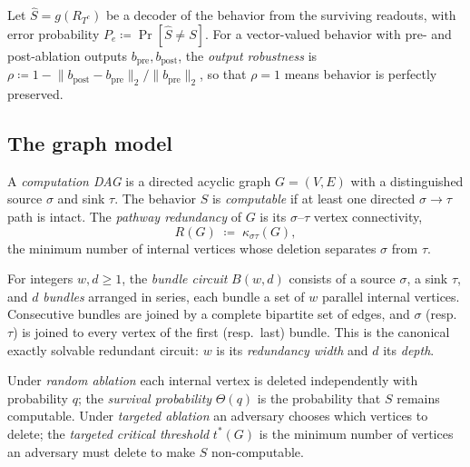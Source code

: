 \begin{definition}
\label{def:fidelity}
Let $\widehat{S}=g(R_{T^c})$ be a decoder of the behavior from the surviving
readouts, with error probability $P_e\coloneqq\Pr[\widehat{S}\neq S]$. For a
vector-valued behavior with pre- and post-ablation outputs $b_{\mathrm{pre}},
b_{\mathrm{post}}$, the \emph{output robustness} is
$\rho\coloneqq 1-\lVert b_{\mathrm{post}}-b_{\mathrm{pre}}\rVert_2/\lVert
b_{\mathrm{pre}}\rVert_2$, so that $\rho=1$ means behavior is perfectly preserved.
\end{definition}

\subsection{The graph model}

\begin{definition}
\label{def:dag}
A \emph{computation DAG} is a directed acyclic graph $G=(V,E)$ with a distinguished
source $\sigma$ and sink $\tau$. The behavior $S$ is \emph{computable} if at least one
directed $\sigma\to\tau$ path is intact. The \emph{pathway redundancy} of $G$ is its
$\sigma$--$\tau$ vertex connectivity,
\[
  R(G)\;\coloneqq\;\kappa_{\sigma\tau}(G),
\]
the minimum number of internal vertices whose deletion separates $\sigma$ from
$\tau$.
\end{definition}

\begin{definition}
\label{def:bundle}
For integers $w,d\ge 1$, the \emph{bundle circuit} $B(w,d)$ consists of a source
$\sigma$, a sink $\tau$, and $d$ \emph{bundles} arranged in series, each bundle a set
of $w$ parallel internal vertices. Consecutive bundles are joined by a complete
bipartite set of edges, and $\sigma$ (resp.\ $\tau$) is joined to every vertex of the
first (resp.\ last) bundle. This is the canonical exactly solvable redundant circuit:
$w$ is its \emph{redundancy width} and $d$ its \emph{depth}.
\end{definition}

\begin{definition}
\label{def:thresholds}
Under \emph{random ablation} each internal vertex is deleted independently with
probability $q$; the \emph{survival probability} $\Theta(q)$ is the probability that
$S$ remains computable. Under \emph{targeted ablation} an adversary chooses which
vertices to delete; the \emph{targeted critical threshold} $t^*(G)$ is the minimum
number of vertices an adversary must delete to make $S$ non-computable.
\end{definition}

